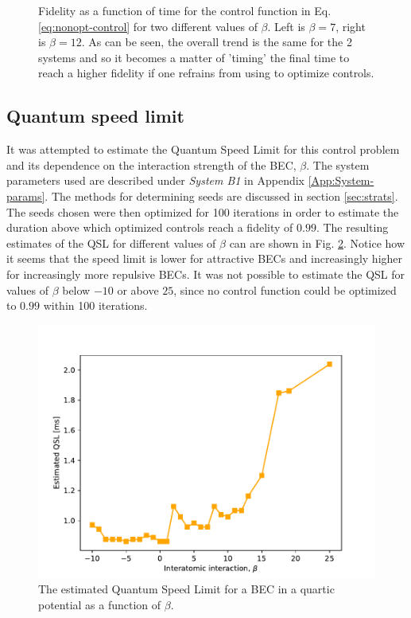 \documentclass[a4paper, twocolumn]{revtex4-1}
\begin{document}
\begin{figure}
\begin{subfigure}{0.45\columnwidth}
	\end{subfigure}
	\caption{Fidelity as a function of time for the control function in Eq. \eqref{eq:nonopt-control} for two different values of $\beta$. Left is $\beta=7$, right is $\beta=12$. As can be seen, the overall trend is the same for the 2 systems and so it becomes a matter of 'timing' the final time to reach a higher fidelity if one refrains from using  to optimize controls.}
	\label{fig:fidelityplot}
\end{figure}

\subsection{Quantum speed limit}
It was attempted to estimate the Quantum Speed Limit for this control problem and its dependence on the interaction strength of the BEC, $\beta$. The system parameters used are described under \textit{System B1} in Appendix \ref{App:System-params}. The methods for determining seeds are discussed in section \ref{sec:strats}. The seeds chosen were then optimized for 100 iterations in order to estimate the duration above which optimized controls reach a fidelity of $0.99$. The resulting estimates of the QSL for different values of $\beta$ can are shown in Fig. \ref{fig:QSL}. Notice how it seems that the speed limit is lower for attractive BECs and increasingly higher for increasingly more repulsive BECs. It was not possible to estimate the QSL for values of $\beta$ below $-10$ or above $25$, since no control function could be optimized to $0.99$ within 100 iterations. \\

\begin{figure}[h]
	\includegraphics[width=\columnwidth]{graphics/exploration/QSL.pdf}
	\caption{The estimated Quantum Speed Limit for a BEC in a quartic potential as a function of $\beta$.}
	\label{fig:QSL}
\end{figure}
\end{document}
